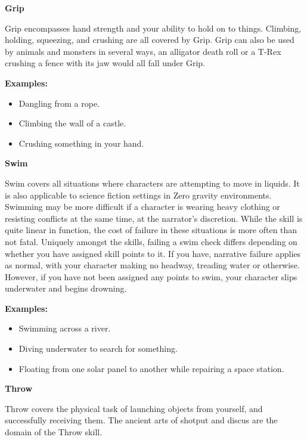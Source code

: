 \textbf{Grip}

Grip encompasses hand strength and your ability to hold on to things. Climbing, holding, squeezing, and crushing are all covered by Grip. Grip can also be used by animals and monsters in several ways, an alligator death roll or a T-Rex crushing a fence with its jaw would all fall under Grip.

\begin{displayquote}
    \textbf{Examples:}
    \begin{itemize}
        \item Dangling from a rope.
        \item Climbing the wall of a castle.
        \item Crushing something in your hand.
    \end{itemize}
\end{displayquote}

\textbf{Swim}

Swim covers all situations where characters are attempting to move in liquids. It is also applicable to science fiction settings in Zero gravity environments. Swimming may be more difficult if a character is wearing heavy clothing or resisting conflicts at the same time, at the narrator's discretion. While the skill is quite linear in function, the cost of failure in these situations is more often than not fatal. Uniquely amongst the skills, failing a swim check differs depending on whether you have assigned skill points to it. If you have, narrative failure applies as normal, with your character making no headway, treading water or otherwise. However, if you have not been assigned any points to swim, your character slips underwater and begins drowning.

\begin{displayquote}
    \textbf{Examples:}
    \begin{itemize}
        \item Swimming across a river.
        \item Diving underwater to search for something.
        \item Floating from one solar panel to another while repairing a space station.
    \end{itemize}
\end{displayquote}

\textbf{Throw}

Throw covers the physical task of launching objects from yourself, and successfully receiving them. The ancient arts of shotput and discus are the domain of the Throw skill.

